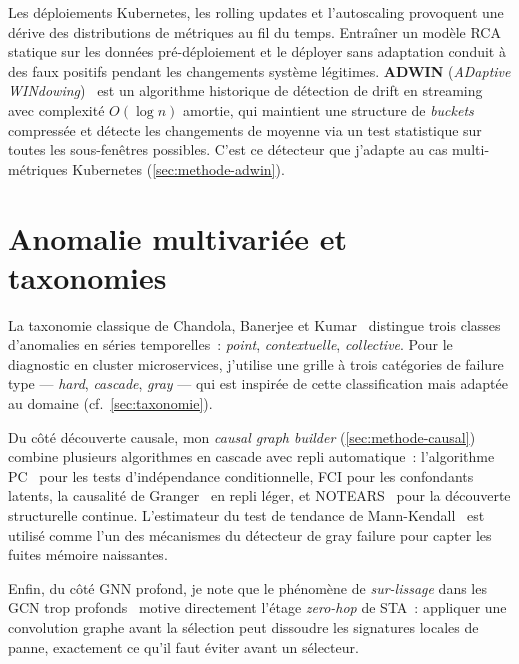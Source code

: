 \documentclass[a4paper,11pt,oneside]{report}
\begin{document}
Les d\'eploiements Kubernetes, les rolling updates et l'autoscaling provoquent une d\'erive des distributions de m\'etriques au fil du temps. Entra\^iner un mod\`ele RCA statique sur les donn\'ees pr\'e-d\'eploiement et le d\'eployer sans adaptation conduit \`a des faux positifs pendant les changements syst\`eme l\'egitimes. \textbf{ADWIN} (\emph{ADaptive WINdowing})~\cite{bifet2007adwin} est un algorithme historique de d\'etection de drift en streaming avec complexit\'e $O(\log n)$ amortie, qui maintient une structure de \emph{buckets} compress\'ee et d\'etecte les changements de moyenne via un test statistique sur toutes les sous-fen\^etres possibles. C'est ce d\'etecteur que j'adapte au cas multi-m\'etriques Kubernetes (\cref{sec:methode-adwin}).

\section{Anomalie multivari\'ee et taxonomies}
\label{sec:eda-anomalie}

La taxonomie classique de Chandola, Banerjee et Kumar~\cite{chandola2009anomaly} distingue trois classes d'anomalies en s\'eries temporelles~: \emph{point}, \emph{contextuelle}, \emph{collective}. Pour le diagnostic en cluster microservices, j'utilise une grille \`a trois cat\'egories de failure type --- \emph{hard}, \emph{cascade}, \emph{gray} --- qui est inspir\'ee de cette classification mais adapt\'ee au domaine (cf.\ \cref{sec:taxonomie}).

Du c\^ot\'e d\'ecouverte causale, mon \emph{causal graph builder} (\cref{sec:methode-causal}) combine plusieurs algorithmes en cascade avec repli automatique~: l'algorithme PC~\cite{spirtes2000causation} pour les tests d'ind\'ependance conditionnelle, FCI pour les confondants latents, la causalit\'e de Granger~\cite{granger1969causality} en repli l\'eger, et NOTEARS~\cite{zheng2018notears} pour la d\'ecouverte structurelle continue. L'estimateur du test de tendance de Mann-Kendall~\cite{mann1945trend} est utilis\'e comme l'un des m\'ecanismes du d\'etecteur de gray failure pour capter les fuites m\'emoire naissantes.

Enfin, du c\^ot\'e GNN profond, je note que le ph\'enom\`ene de \emph{sur-lissage} dans les GCN trop profonds~\cite{li2018deepergcn} motive directement l'\'etage \emph{zero-hop} de STA~: appliquer une convolution graphe avant la s\'election peut dissoudre les signatures locales de panne, exactement ce qu'il faut \'eviter avant un s\'electeur.
\end{document}
